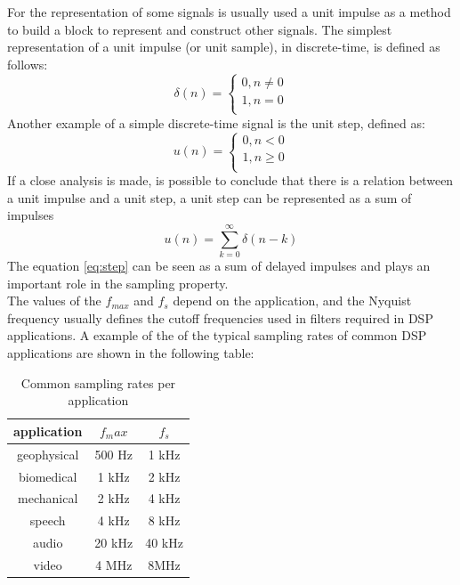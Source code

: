For the representation of some signals is usually used a unit impulse as a method to build a block to represent and construct other signals. The simplest representation of a unit impulse (or unit sample), in discrete-time, is defined as follows:
\begin{equation}
    \delta(n) = \left\{ \begin{matrix} 
    0, n \ne 0\\
    1, n = 0\\
    \end{matrix}\right.
\end{equation}
Another example of a simple discrete-time signal is the unit step, defined as:
\begin{equation}
    u(n) = \left\{ \begin{matrix} 
    0, n < 0\\
    1, n \geq 0\\
    \end{matrix}\right.
\end{equation}
If a close analysis is made, is possible to conclude that there is a relation between a unit impulse and a unit step, a unit step can be represented as a sum of impulses
\begin{equation}\label{eq:step}
    u(n) = \sum_{k=0}^{\infty}\delta(n-k)
\end{equation}
The equation \ref{eq:step} can be seen as a sum of delayed impulses and plays an important role in the sampling property.\\
The values of the $f_{max}$ and $f_s$ depend on the application, and the Nyquist frequency usually defines the cutoff frequencies used in filters required in DSP applications. A example of the of the typical sampling rates of common DSP applications are shown in the following table:   
\begin{table}[!htpb]
   \centering
   \begin{tabular}{|c|c|c|} \toprule
       {application}&{$f_max$}&{$f_s$}\\
       \toprule
       {geophysical}&{500 Hz}&{1 kHz}\\
       {biomedical}&{1 kHz}&{2 kHz}\\
       {mechanical}&{2 kHz}&{4 kHz}\\
       {speech}&{4 kHz}&{8 kHz}\\
       {audio}&{20 kHz}&{40 kHz}\\
       {video}&{4 MHz}&{8MHz}\\
       \bottomrule
   \end{tabular} 
   \caption{Common sampling rates per application}{\cite{orfanidisIntroductionSignalProcessing1996}}  
    \label{tab:sampRat}     
\end{table} 

